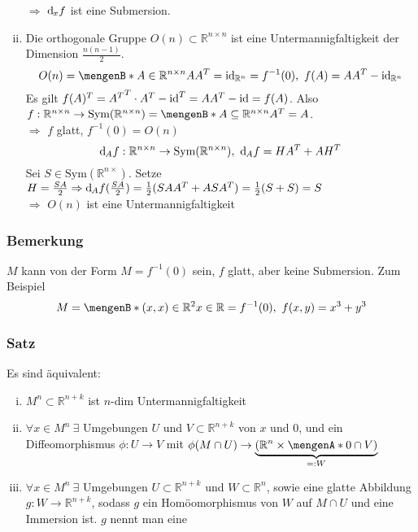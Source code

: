 \begin{enumerate}[(i)]
\[	\]
	$\Rightarrow$ $\mathrm{d}\mkern-1.0mu_x f$ ist eine Submersion.
	\item Die orthogonale Gruppe $O(n) \subset \mathds{R}^{n \times n}$ ist eine Untermannigfaltigkeit der Dimension $\frac{n(n-1)}{2}$.
	\[
		O(n) = \set[A \in \mathds{R}^{n \times n}]{AA^T = \id_{\mathds{R}^n} = f^{-1}(0)},\ f(A) = AA^T - \id_{\mathds{R}^n}
	\]
	Es gilt $f(A)^T = {A^T}^T \cdot A^T - \operatorname{id}^T = AA^T - \operatorname{id} = f(A)$. Also $f:\mathds{R}^{n \times n} \to \text{Sym}(\mathds{R}^{n \times n}) = \set[A \subseteq \mathds{R}^{n \times n}]{A^T = A}$.\\
	$\Rightarrow$ $f$ glatt, $f^{-1}(0) = O(n)$
	\[
		\mathrm{d}\mkern-1.0mu_A f:\mathbb{R}^{n \times n} \to \text{Sym}(\mathbb{R}^{n \times n}),\ \mathrm{d}\mkern-1.0mu_A f = HA^T+AH^T
	\]
	Sei $S \in \text{Sym}(\mathds{R}^{n \times})$. Setze $H = \frac{SA}{2} \Rightarrow \mathrm{d}\mkern-1.0mu_A f(\frac{SA}{2}) = \frac{1}{2}(SAA^T+ASA^T) = \frac{1}{2}(S +  S) = S$\\
	$\Rightarrow$ $O(n)$ ist eine Untermannigfaltigkeit
\end{enumerate}

\subsubsection[Bemerkung: ]{Bemerkung} %
\label{ssub:18}
$M$ kann von der Form $M = f^{-1}(0)$ sein, $f$ glatt, aber keine Submersion. Zum Beispiel
	\[
		M = \set[(x,x)\in \mathds{R}^2]{x \in \mathds{R}} = f^{-1}(0),\ f(x,y) = x^3 +y^3	
	\]
	
\subsubsection[Satz: lokale Parametrisierung von Untermannigfaltigkeiten]{Satz}
\label{ssub:19}
Es sind äquivalent:
\begin{enumerate}[(i)]
	\item $M^n\subset \mathds{R}^{n+k}$ ist $n$-dim Untermannigfaltigkeit
	\item $\forall x \in M^n\ \exists$ Umgebungen $U$ und $V \subset \mathds{R}^{n+k}$ von $x$ und $0$, und ein Diffeomorphismus $\phi: U \to V$ mit $\phi(M\cap U) \to \underbrace{(\mathds{R}^n \times \set{0}\cap V)}_{=: W}$
	\item $\forall x \in M^n\ \exists$ Umgebungen $U\subset \mathds{R}^{n+k}$ und $W\subset \mathds{R}^n$, sowie eine glatte Abbildung $g:W \to \mathds{R}^{n+k}$, sodass $g$ ein Homöomorphismus von $W$ auf $M\cap U$ und eine Immersion ist. $g$ nennt man eine 
\end{enumerate}

